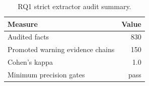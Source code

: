 \begin{table}[t]
\centering
\caption{RQ1 strict extractor audit summary.}
\label{tab:rq1-extractor-audit}
\begin{tabular}{lr}
\toprule
Measure & Value \\
\midrule
Audited facts & 830 \\
Promoted warning evidence chains & 150 \\
Cohen's kappa & 1.0 \\
Minimum precision gates & pass \\
\bottomrule
\end{tabular}
\end{table}
